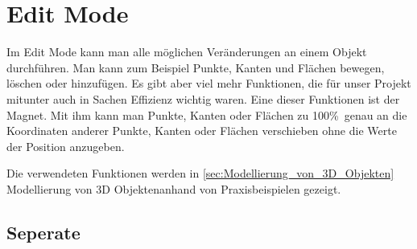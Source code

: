 \section{Edit Mode}
Im Edit Mode kann man alle möglichen Veränderungen an einem Objekt durchführen. Man kann zum Beispiel Punkte, Kanten und Flächen bewegen, löschen oder hinzufügen.
Es gibt aber viel mehr Funktionen, die für unser Projekt mitunter auch in Sachen Effizienz wichtig waren. Eine dieser Funktionen ist der Magnet. Mit ihm kann man Punkte, Kanten oder Flächen zu 100\%\ genau an
die Koordinaten anderer Punkte, Kanten oder Flächen verschieben ohne die Werte der Position anzugeben.

Die verwendeten Funktionen werden in  \autoref{sec:Modellierung_von_3D_Objekten} \dq  Modellierung von 3D Objekten\dq anhand von
Praxisbeispielen gezeigt.

\subsection{Seperate}